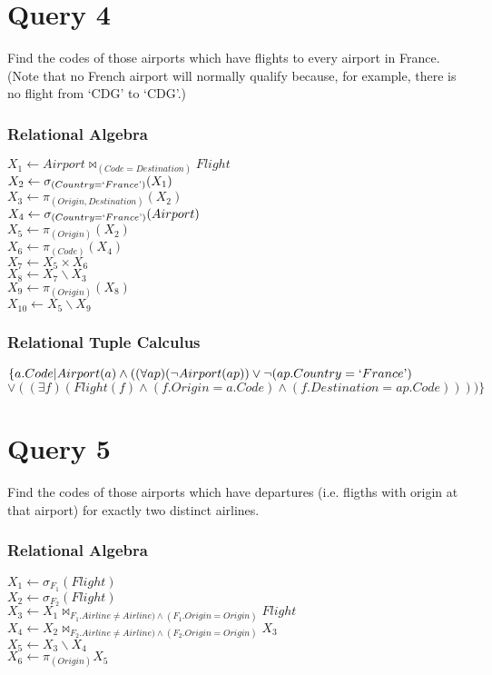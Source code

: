 \documentclass[a4paper,11pt,twoside]{article}
\begin{document}
\section*{Query 4}
Find the codes of those airports which have flights to every airport in France. (Note that no French airport will normally qualify because, for example, there is no flight from `CDG' to `CDG'.)

\subsubsection*{Relational Algebra}
$X_1 \leftarrow Airport \Join_ {(Code=Destination)} Flight$\\
$X_2 \leftarrow \sigma _{(Country=`France\textrm')} (X_1)$\\
$X_3 \leftarrow \pi_{(Origin, Destination)}(X_2)$\\
$X_4 \leftarrow \sigma_{(Country=`France\textrm')}(Airport)$\\
$X_5 \leftarrow \pi_{(Origin)}(X_2)$\\
$X_6 \leftarrow \pi_{(Code)}(X_4)$\\
$X_7 \leftarrow X_5 \times X_6$\\
$X_8 \leftarrow X_7 \backslash X_3$\\
$X_9 \leftarrow \pi_{(Origin)}(X_8)$\\
$X_{10} \leftarrow X_5 \backslash X_9$\\

\subsubsection*{Relational Tuple Calculus}
$\{a.Code|Airport(a) \land ((\forall ap)(\neg Airport(ap)) \lor \neg(ap.Country = `France\textrm')$\\
$\lor ((\exists f)(Flight(f) \land (f.Origin = a.Code) \land (f.Destination = ap.Code))))\}$


\section*{Query 5}
Find the codes of those airports which have departures (i.e. fligths with origin at that airport) for exactly two distinct airlines.
\subsubsection*{Relational Algebra}
$X_1 \leftarrow \sigma _{F_1}(Flight)$\\
$X_2 \leftarrow \sigma _{F_2}(Flight)$\\
$X_3 \leftarrow X_1 \Join _{F_1.Airline \neq Airline) \land (F_1.Origin=Origin)} Flight$\\
$X_4 \leftarrow X_2 \Join _{F_2.Airline \neq Airline) \land (F_2.Origin=Origin)} X_3$\\
$X_5 \leftarrow X_3 \backslash X_4$\\
$X_6 \leftarrow \pi_{(Origin)} X_5$\\
\end{document}

